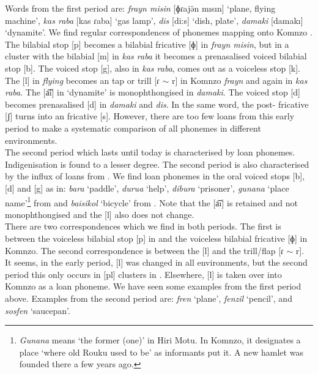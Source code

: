 Words from the first period are: \emph{frayn misin} [ɸɾajə̆n mısın] `plane, flying machine', \emph{kas raba} [kas ɾaba] `gas lamp', \emph{dis} [di:s] `dish, plate', \emph{damaki} [damakı] `dynamite'. We find regular correspondences of  phonemes mapping onto Komnzo . The bilabial stop [p] becomes a bilabial fricative [ɸ] in \emph{frayn misin}, but in a cluster with the bilabial  [m] in \emph{kas raba} it becomes a prenasalised voiced bilabial stop [b]. The  voiced stop [g], also in \emph{kas raba}, comes out as a voiceless  stop [k]. The   [l] in  \emph{flying} becomes an  tap or trill [ɾ $\sim$ r] in Komnzo \emph{frayn} and again in \emph{kas raba}. The   [a͡i] in `dynamite' is monophthongised in \emph{damaki}. The voiced  stop [d] becomes prenasalised [d] in \emph{damaki} and \emph{dis}. In the same word, the post- fricative [ʃ] turns into an  fricative [s]. However, there are too few loans from this early period to make a systematic comparison of all  phonemes in different environments.\\

The second period which lasts until today is characterised by loan phonemes. Indigenisation is found to a lesser degree. The second period is also characterised by the influx of loans from . We find loan phonemes in the oral voiced stops [b], [d] and [g] as in: \emph{bara} `paddle', \emph{durua} `help', \emph{dibura} `prisoner', \emph{gunana} `place name'\footnote{\emph{Gunana} means `the former (one)' in Hiri Motu. In Komnzo, it designates a place `where old Rouku used to be' as informants put it. A new hamlet was founded there a few years ago.} from  and \emph{baisikol} `bicycle' from . Note that the   [a͡ı] is retained and not monophthongised and the   [l] also does not change.\\

There are two correspondences which we find in both periods. The first is between the voiceless bilabial stop [p] in  and the voiceless bilabial fricative [ɸ] in Komnzo. The second correspondence is between the   [l] and the  trill/flap [ɾ $\sim$ r]. It seems, in the early period, [l] was changed in all environments, but the second period this only occurs in [pl] clusters in . Elsewhere, [l] is taken over into Komnzo as a loan phoneme. We have seen some examples from the first period above. Examples from the second period are: \emph{fren} `plane', \emph{fenzil} `pencil', and \emph{sosfen} `saucepan'.

